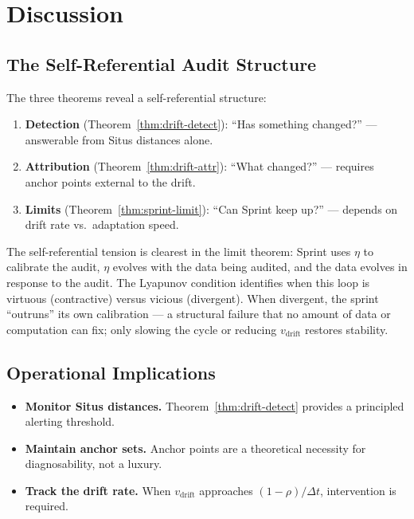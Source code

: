 \documentclass[12pt,a4paper]{article}
\begin{document}
\section{Discussion}

\subsection{The Self-Referential Audit Structure}

The three theorems reveal a self-referential structure:
\begin{enumerate}[label=(\arabic*)]
    \item \textbf{Detection} (Theorem~\ref{thm:drift-detect}):
          ``Has something changed?'' --- answerable from Situs distances alone.
    \item \textbf{Attribution} (Theorem~\ref{thm:drift-attr}):
          ``What changed?'' --- requires anchor points external to the drift.
    \item \textbf{Limits} (Theorem~\ref{thm:sprint-limit}):
          ``Can Sprint keep up?'' --- depends on drift rate vs.\ adaptation speed.
\end{enumerate}

The self-referential tension is clearest in the limit theorem: Sprint uses
$\eta$ to calibrate the audit, $\eta$ evolves with the data being audited,
and the data evolves in response to the audit.  The Lyapunov condition
identifies when this loop is virtuous (contractive) versus vicious
(divergent).  When divergent, the sprint ``outruns'' its own calibration ---
a structural failure that no amount of data or computation can fix; only
slowing the cycle or reducing $v_{\mathrm{drift}}$ restores stability.

\subsection{Operational Implications}

\begin{itemize}
    \item \textbf{Monitor Situs distances.} Theorem~\ref{thm:drift-detect}
          provides a principled alerting threshold.
    \item \textbf{Maintain anchor sets.} Anchor points are a theoretical
          necessity for diagnosability, not a luxury.
    \item \textbf{Track the drift rate.} When $v_{\mathrm{drift}}$ approaches
          $(1-\rho)/\Delta t$, intervention is required.
\end{itemize}
\end{document}
